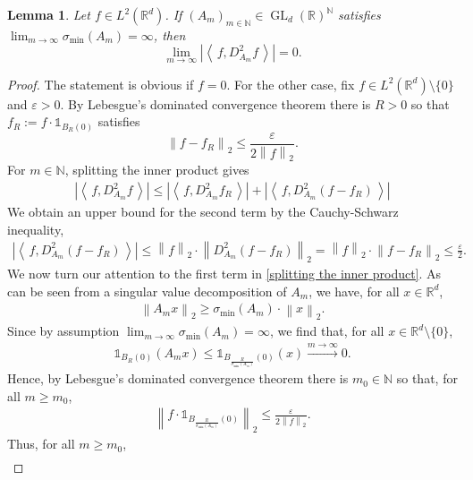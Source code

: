 \documentclass[11pt]{amsart}
\newcommand{\R}{{\mathbb{R}}}
\newcommand{\N}{\mathbb{N}}
\newcommand{\norm}[1]{\ensuremath{\left\lVert\text{}#1\text{}\right\rVert}}
\newcommand{\ip}[1]{\ensuremath{\left<\text{} \, #1 \, \text{}\right>}}
\DeclareMathOperator{\GL}{GL}
\newtheorem{lemma}[theorem]{Lemma}
\newenvironment{proof sketch} {\textit{Proof sketch.}}{}
\begin{document}
  \begin{lemma}\label{lem: ip of f and dilation of f converges to zero}
    Let $f \in L^2(\R^d)$. If $(A_m)_{m \in \N} \in \GL_d(\R)^\N$ 
    satisfies $\lim_{m \to \infty}\sigma_{\text{min}}(A_m)=\infty$, then
    \[\lim_{m \to \infty} \left|\ip{f,D_{A_m}^2f}\right|=0.\]
  \end{lemma}
  \begin{proof}
    The statement is obvious if $f=0$. For the other case, fix $f \in L^2(\R^d) \setminus \{0\}$ and $\varepsilon>0$. By Lebesgue's dominated convergence theorem there is $R>0$ so that $f_R:=f \cdot \mathds{1}_{B_R(0)}$ satisfies
    \[\norm{f-f_R}_2 \leq \frac{\varepsilon}{2\norm{f}_2}.\]
    For $m \in \N$, splitting the inner product gives
    \begin{align}\label{splitting the inner product}
      \left|\ip{f,D_{A_m}^2f}\right|
       \leq \left|\ip{f,D_{A_m}^2f_R}\right|+\left|\ip{f,D_{A_m}^2(f-f_R)}\right|
    \end{align} 
    We obtain an upper bound for the second term by the Cauchy-Schwarz inequality, 
    \begin{align}\label{estimate of second term}
      \left|\ip{f,D_{A_m}^2(f-f_R)}\right| \leq \norm{f}_2 \cdot \norm{D_{A_m}^2(f-f_R)}_2 = \norm{f}_2 \cdot \norm{f-f_R}_2 \leq \frac{\varepsilon}{2}.
    \end{align}
    We now turn our attention to the first term in \eqref{splitting the inner product}. As can be seen from a singular value decomposition of $A_m$, we have, for all $x \in \R^d$,
    \begin{align*}
      \norm{A_mx}_2 \geq \sigma_{\text{min}}(A_m) \cdot \norm{x}_2.
    \end{align*}
    Since by assumption $\lim_{m \to \infty}\sigma_{\text{min}}(A_m)=\infty$, we find that, for all $x \in \R^d \setminus \{0\}$,
    \begin{align*}
      \mathds{1}_{B_R(0)}(A_mx) \leq \mathds{1}_{B_\frac{R}{\sigma_{\text{min}}(A_m)}(0)}(x) \xrightarrow{m \to \infty} 0. 
    \end{align*}
    Hence, by Lebesgue's dominated convergence theorem there is $m_0 \in \N$ so that, for all $m \geq m_0$,
    \begin{align*}
      \norm{f \cdot \mathds{1}_{B_\frac{R}{\sigma_{\text{min}}(A_m)}(0)}}_2 \leq \frac{\varepsilon}{2 \norm{f}_2}.
    \end{align*} 
    Thus, for all $m \geq m_0$,
    \begin{align}\label{estimate of first term}

\end{align}
\end{proof}
\end{document}
